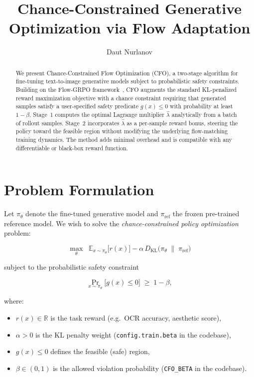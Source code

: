 \documentclass[11pt]{article}
\title{\textbf{Chance-Constrained Generative Optimization via Flow Adaptation}}
\author{Daut Nurlanov}
\date{}
\begin{document}
\maketitle

\begin{abstract}
We present Chance-Constrained Flow Optimization (CFO), a two-stage algorithm
for fine-tuning text-to-image generative models subject to probabilistic safety
constraints. Building on the Flow-GRPO framework~\cite{flowgrpo2025}, CFO
augments the standard KL-penalized reward maximization objective with a
chance constraint requiring that generated samples satisfy a user-specified
safety predicate $g(x) \le 0$ with probability at least $1-\beta$. Stage~1
computes the optimal Lagrange multiplier $\hat{\lambda}$ analytically from a
batch of rollout samples. Stage~2 incorporates $\hat{\lambda}$ as a per-sample
reward bonus, steering the policy toward the feasible region without modifying
the underlying flow-matching training dynamics. The method adds minimal
overhead and is compatible with any differentiable or black-box reward
function.
\end{abstract}

\section{Problem Formulation}

Let $\pi_\theta$ denote the fine-tuned generative model and $\pi_{\mathrm{ref}}$
the frozen pre-trained reference model. We wish to solve the
\emph{chance-constrained policy optimization} problem:

\begin{equation}
    \max_{\theta} \;\; \mathbb{E}_{x \sim \pi_\theta}\bigl[r(x)\bigr]
    - \alpha \, D_{\mathrm{KL}}\!\bigl(\pi_\theta \;\|\; \pi_{\mathrm{ref}}\bigr)
    \label{eq:primal}
\end{equation}

subject to the probabilistic safety constraint

\begin{equation}
    \Pr_{x \sim \pi_\theta}\bigl[g(x) \le 0\bigr] \;\ge\; 1 - \beta,
    \label{eq:constraint}
\end{equation}

where:
\begin{itemize}
    \item $r(x) \in \mathbb{R}$ is the task reward (e.g.\ OCR accuracy, aesthetic score),
    \item $\alpha > 0$ is the KL penalty weight (\texttt{config.train.beta} in the codebase),
    \item $g(x) \le 0$ defines the feasible (safe) region,
    \item $\beta \in (0,1)$ is the allowed violation probability (\texttt{CFO\_BETA} in the codebase).
\end{itemize}
\end{document}
